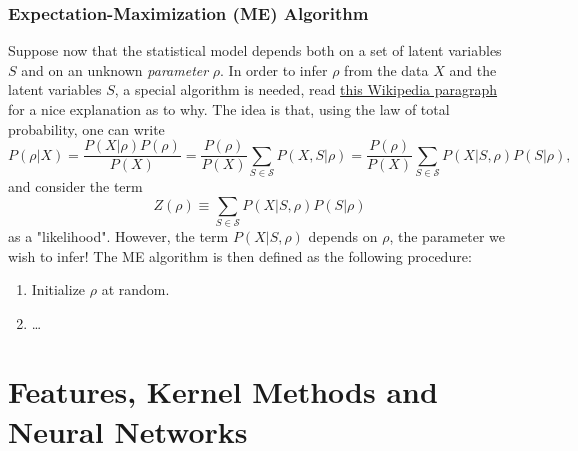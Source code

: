 \documentclass{article}
\begin{document}
\subsubsection*{Expectation-Maximization (ME) Algorithm}
Suppose now that the statistical model depends both on a set of latent variables $S$ and on an unknown \emph{parameter} $\rho$. In order to infer $\rho$ from the data $X$ and the latent variables $S$, a special algorithm is needed, read \href{https://en.wikipedia.org/wiki/Expectation-maximization_algorithm#Introduction}{this Wikipedia paragraph} for a nice explanation as to why. The idea is that, using the law of total probability, one can write
\begin{equation}
    P(\rho | X)
    =
    \frac{P(X|\rho) P(\rho)}{P(X)}
    =
    \frac{P(\rho)}{P(X)}
    \sum_{S\in\mathcal{S}} P(X,S|\rho)
    =
    \frac{P(\rho)}{P(X)}
    \sum_{S\in\mathcal{S}} P(X|S,\rho) P(S|\rho),
\end{equation}
and consider the term
$$Z(\rho) \equiv \sum_{S\in\mathcal{S}} P(X|S,\rho) P(S|\rho)$$
as a "likelihood". However, the term $P(X|S,\rho)$ depends on $\rho$, the parameter we wish to infer! The ME algorithm is then defined as the following procedure:
\begin{enumerate}
    \item Initialize $\rho$ at random.
    \item \dots
\end{enumerate}

\section{Features, Kernel Methods and Neural Networks}
\end{document}
